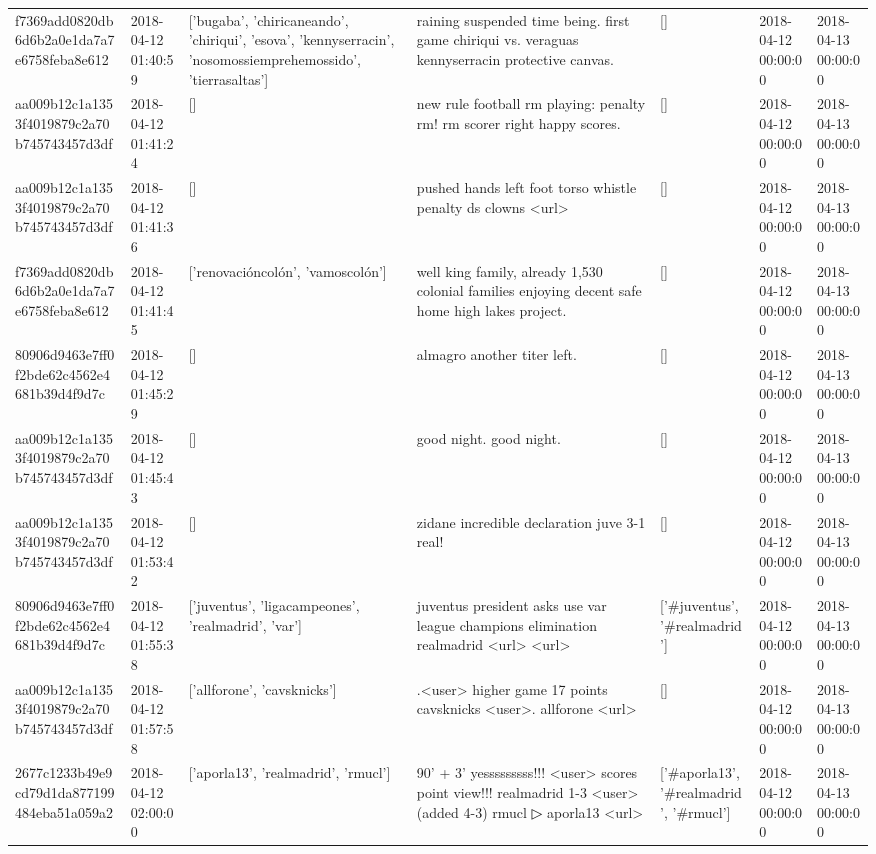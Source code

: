 \begin{tabular}{lllllll}
f7369add0820db6d6b2a0e1da7a7e6758feba8e612 & 2018-04-12 01:40:59 & ['bugaba', 'chiricaneando', 'chiriqui', 'esova', 'kennyserracin', 'nosomossiemprehemossido', 'tierrasaltas'] & raining suspended time being. first game chiriqui vs. veraguas kennyserracin protective canvas. & [] & 2018-04-12 00:00:00 & 2018-04-13 00:00:00 \\
aa009b12c1a1353f4019879c2a70b745743457d3df & 2018-04-12 01:41:24 & [] & new rule football rm playing: penalty rm! rm scorer right happy scores. & [] & 2018-04-12 00:00:00 & 2018-04-13 00:00:00 \\
aa009b12c1a1353f4019879c2a70b745743457d3df & 2018-04-12 01:41:36 & [] & pushed hands left foot torso whistle penalty ds clowns <url> & [] & 2018-04-12 00:00:00 & 2018-04-13 00:00:00 \\
f7369add0820db6d6b2a0e1da7a7e6758feba8e612 & 2018-04-12 01:41:45 & ['renovacióncolón', 'vamoscolón'] & well king family, already 1,530 colonial families enjoying decent safe home high lakes project. & [] & 2018-04-12 00:00:00 & 2018-04-13 00:00:00 \\
80906d9463e7ff0f2bde62c4562e4681b39d4f9d7c & 2018-04-12 01:45:29 & [] & almagro another titer left. & [] & 2018-04-12 00:00:00 & 2018-04-13 00:00:00 \\
aa009b12c1a1353f4019879c2a70b745743457d3df & 2018-04-12 01:45:43 & [] & good night. good night. & [] & 2018-04-12 00:00:00 & 2018-04-13 00:00:00 \\
aa009b12c1a1353f4019879c2a70b745743457d3df & 2018-04-12 01:53:42 & [] & zidane incredible declaration juve 3-1 real! & [] & 2018-04-12 00:00:00 & 2018-04-13 00:00:00 \\
80906d9463e7ff0f2bde62c4562e4681b39d4f9d7c & 2018-04-12 01:55:38 & ['juventus', 'ligacampeones', 'realmadrid', 'var'] & juventus president asks use var league champions elimination realmadrid <url> <url> & ['#juventus', '#realmadrid'] & 2018-04-12 00:00:00 & 2018-04-13 00:00:00 \\
aa009b12c1a1353f4019879c2a70b745743457d3df & 2018-04-12 01:57:58 & ['allforone', 'cavsknicks'] & .<user> higher game 17 points cavsknicks <user>. allforone <url> & [] & 2018-04-12 00:00:00 & 2018-04-13 00:00:00 \\
2677c1233b49e9cd79d1da877199484eba51a059a2 & 2018-04-12 02:00:00 & ['aporla13', 'realmadrid', 'rmucl'] & 90' + 3' yesssssssss!!! <user> scores point view!!! realmadrid 1-3 <user> (added 4-3) rmucl ▷ aporla13 <url> & ['#aporla13', '#realmadrid', '#rmucl'] & 2018-04-12 00:00:00 & 2018-04-13 00:00:00 \\

\end{tabular}
